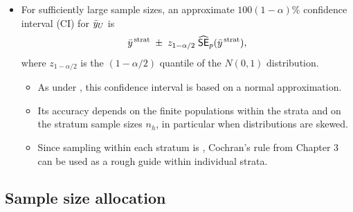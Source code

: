 \documentclass{my_eth_beamer}
\numberwithin{equation}{section}
\begin{document}
\begin{frame}
    \begin{itemize}
    \setlength{\itemsep}{10pt}
        \item For sufficiently large sample sizes, an approximate
            $100(1-\alpha)\%$ \alert{confidence interval} (CI) for $\bar{y}_U$ is
            \begin{equation*}
                \bar{y}^{\, \mathrm{strat}} \; \pm \; z_{1-\alpha/2}\; \widehat{\mathsf{SE}}_p(\bar{y}^{\, \mathrm{strat}}),
            \end{equation*}
            where $z_{1-\alpha/2}$ is the $(1-\alpha/2)$ quantile of the
            $N(0,1)$ distribution.
            \vspace{0.75em}
            \begin{itemize}
            \setlength{\itemsep}{10pt}
                \item As under \SRS, this confidence interval is based on a
                    \alert{normal approximation}.
                \item Its accuracy depends on the finite populations within the
                    strata and on the stratum sample sizes $n_h$, in particular
                    when distributions are skewed.
                \item Since sampling within each stratum is \SRS,
                    \alert{Cochran's rule} from Chapter 3 can be used as a
                    \alert{rough guide within individual strata}.
            \end{itemize}
    \end{itemize}
\end{frame}

\subsection{Sample size allocation}\label{sec:strat_allocation}
\end{document}
